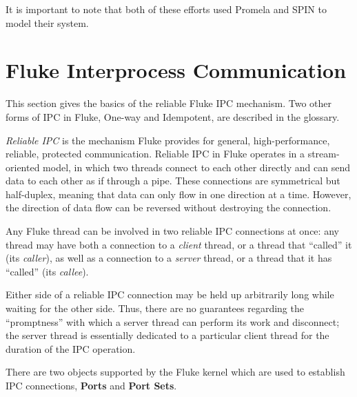 \documentclass{article}
\begin{document}

It is important to note that both of these efforts used Promela and
SPIN to model their system.

\section*{Fluke Interprocess Communication}

This section gives the basics of the reliable Fluke IPC mechanism.
Two other forms of IPC in Fluke, One-way and Idempotent, are
described in the glossary.

{\em Reliable IPC} is the mechanism Fluke provides
for general, high-performance, reliable, protected communication.
Reliable IPC in Fluke operates in a stream-oriented model,
in which two threads connect to each other directly
and can send data to each other as if through a pipe.
These connections are symmetrical but half-duplex,
meaning that data can only flow in one direction at a time.
However, the direction of data flow can be reversed
without destroying the connection.

Any Fluke thread can be involved in two reliable IPC connections at once:
any thread may have both a connection to a {\em client} thread,
or a thread that ``called'' it (its {\em caller}),
as well as a connection to a {\em server} thread,
or a thread that it has ``called'' (its {\em callee}).

Either side of a reliable IPC connection
may be held up arbitrarily long while waiting for the other side.
Thus, there are no guarantees regarding the ``promptness''
with which a server thread can perform its work and disconnect;
the server thread is essentially dedicated to a particular client thread
for the duration of the IPC operation.

There are two objects supported by the Fluke kernel 
which are used to establish IPC connections, {\bf Ports}
and {\bf Port Sets}.
\end{document}
